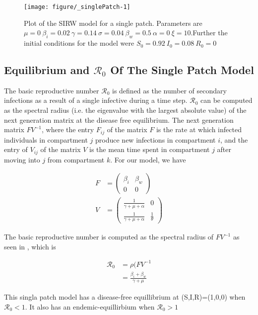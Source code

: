 \documentclass[12pt]{article}\usepackage[]{graphicx}\usepackage[]{color}
\makeatletter
\def\maxwidth{ %
  \ifdim\Gin@nat@width>\linewidth
    \linewidth
  \else
    \Gin@nat@width
  \fi
}
\newenvironment{knitrout}{}{} %
\makeatother
\begin{document}
\begin{knitrout}
\color{fgcolor}\begin{figure}[h]
\texttt{[image: figure/\_singlePatch-1]} \caption{\label{fig:singlepatch} Plot of the SIRW model for a single patch. Parameters are $\mu=0\ \beta_i=0.02\ \gamma=0.14\ \sigma=0.04\ \beta_w=0.5\ \alpha=0\ \xi=10$.Further the initial conditions for the model were $S_0=0.92\ I_0=0.08\ R_0=0$}\label{fig:<singlePatch}
\end{figure}


\end{knitrout}
\FloatBarrier
\subsection{Equilibrium and {$\mathcal R_0$} Of The Single Patch Model}

The basic reproductive number ${\mathcal R_0}$ is defined as the number of secondary infections as a result of a single infective during a time step.
${\mathcal R_0}$ can be computed as the spectral radius (i.e. the eigenvalue with the largest absolute value) of the next generation matrix at the disease free equilibrium.
The next generation matrix $FV^{−1}$, where the entry $F_{ij}$ of the matrix $F$ is the rate at which infected individuals in compartment $j$ produce new infections in compartment $i$, and the entry of $V_{ij}$ of the matrix $V$ is the mean time spent in compartment $j$ after moving into $j$ from compartment $k$.
For our model, we have
\begin{linenomath}
\begin{align*}
		F&=\begin{pmatrix}
			\beta_i & \beta_w\\
			0 & 0
			\end{pmatrix}\\
		V&=\begin{pmatrix}
			\frac{1}{\gamma+\mu+\alpha} & 0\\
			\frac{1}{\gamma+\mu+\alpha} &\frac{1}{\theta}
			\end{pmatrix}
\end{align*}
\end{linenomath}
The basic reproductive number is computed as the spectral radius of $FV^{-1}$ as seen in \cite{link9}, which is
\begin{linenomath}
\begin{align*}
    {\mathcal R_0} &= \rho(FV^{-1}\\
		           &=\frac{\beta_i+\beta_w}{\gamma+\mu}
\end{align*}
\end{linenomath}
This singla patch model has a disease-free equillibrium at (S,I,R)=(1,0,0) when ${\mathcal R_0}<1$.
It also has an endemic-equillirbium when ${\mathcal R_0}>1$
\end{document}
